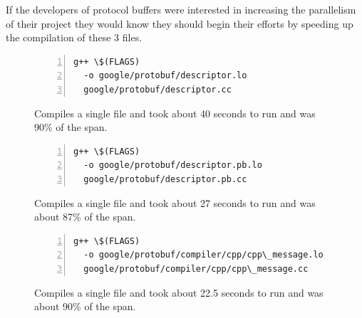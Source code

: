 \documentclass[sigconf,10pt,review,authorversion]{acmart}\settopmatter{printfolios=true,printccs=false,printacmref=false}
\begin{document}
If the developers of protocol buffers were interested in increasing the parallelism of
their project they would know they should begin their efforts by speeding up the
compilation of these 3 files.

\begin{figure}[H]
\begin{Verbatim}[commandchars=\\\{\},codes={\catcode`$=3\catcode`^=7\catcode`_=8},fontsize=\small,numbers=left,xleftmargin=5mm]
  g++ \$(FLAGS)
  -o google/protobuf/descriptor.lo
  google/protobuf/descriptor.cc
\end{Verbatim}
\caption{Compiles a single file and took about 40 seconds to run and was 90\% of the span.}
\label{code:g++1}
\end{figure}

\begin{figure}[H]
\begin{Verbatim}[commandchars=\\\{\},codes={\catcode`$=3\catcode`^=7\catcode`_=8},fontsize=\small,numbers=left,xleftmargin=5mm]
  g++ \$(FLAGS)
  -o google/protobuf/descriptor.pb.lo
  google/protobuf/descriptor.pb.cc
\end{Verbatim}
\caption{Compiles a single file and took about 27 seconds to run and was about 87\% of the span.}
\label{code:g++2}
\end{figure}

\begin{figure}[H]
\begin{Verbatim}[commandchars=\\\{\},codes={\catcode`$=3\catcode`^=7\catcode`_=8},fontsize=\small,numbers=left,xleftmargin=5mm]
  g++ \$(FLAGS)
  -o google/protobuf/compiler/cpp/cpp\_message.lo
  google/protobuf/compiler/cpp/cpp\_message.cc
\end{Verbatim}
\caption{Compiles a single file and took about 22.5 seconds to run and was about 90\% of the span.}
\label{code:g++3}
\end{figure}

\end{document}
